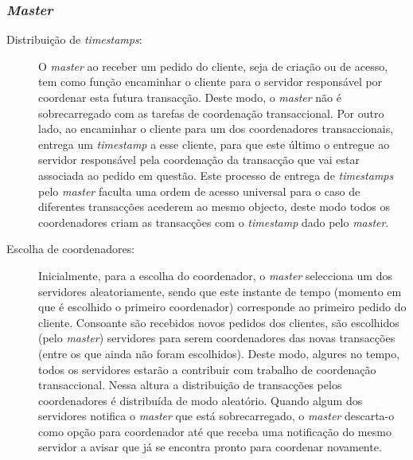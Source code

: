\subsubsection{\textit{Master}}

\begin{description}

\item[Distribuição de \textit{timestamps}:]
O \textit{\textit{master}} ao receber um pedido do cliente, seja de criação ou de acesso, tem como função encaminhar o cliente para o servidor responsável por coordenar esta futura transacção. Deste modo, o \textit{master} não é sobrecarregado com as tarefas de coordenação transaccional. Por outro lado, ao encaminhar o cliente para um dos coordenadores transaccionais, entrega um \textit{timestamp} a esse cliente, para que este último o entregue ao servidor responsável pela coordenação da transacção que vai estar associada ao pedido em questão. Este processo de entrega de \textit{timestamps} pelo \textit{master} faculta uma ordem de acesso universal para o caso de diferentes transacções acederem ao mesmo objecto, deste modo todos os coordenadores criam as transacções com o \textit{timestamp} dado pelo \textit{master}.

\item[Escolha de coordenadores:]
Inicialmente, para a escolha do coordenador, o \textit{master} selecciona um dos servidores aleatoriamente, sendo que este instante de tempo (momento em que é escolhido o primeiro coordenador) corresponde ao primeiro pedido do cliente. Consoante são recebidos novos pedidos dos clientes, são escolhidos (pelo \textit{master}) servidores para serem coordenadores das novas transacções (entre os que ainda não foram escolhidos). Deste modo, algures no tempo, todos os servidores estarão a contribuir com trabalho de coordenação transaccional. Nessa altura a distribuição de transacções pelos coordenadores é distribuída de modo aleatório. Quando algum dos servidores notifica o \textit{master} que está  sobrecarregado, o \textit{master} descarta-o como opção para coordenador até que receba uma notificação do mesmo servidor a avisar que já se encontra pronto para coordenar novamente.


\end{description}
